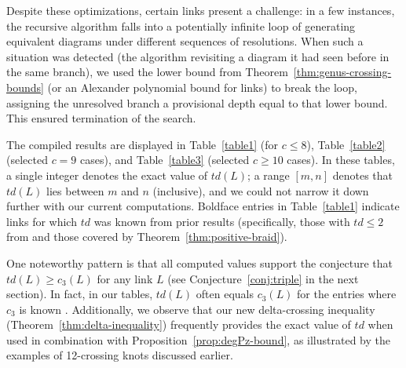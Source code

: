 \documentclass[pdftex, a4paper, 12pt, oneside]{amsart}
\numberwithin{equation}{section}
\theoremstyle{plain}
\theoremstyle{definition}
\begin{document}
	Despite these optimizations, certain links present a challenge: in a few instances, the recursive algorithm falls into a potentially infinite loop of generating equivalent diagrams under different sequences of resolutions. When such a situation was detected (the algorithm revisiting a diagram it had seen before in the same branch), we used the lower bound from Theorem~\ref{thm:genus-crossing-bounds} (or an Alexander polynomial bound for links) to break the loop, assigning the unresolved branch a provisional depth equal to that lower bound. This ensured termination of the search.
	
	The compiled results are displayed in Table~\ref{table1} (for $c\le 8$), Table~\ref{table2} (selected $c=9$ cases), and Table~\ref{table3} (selected $c\ge 10$ cases). In these tables, a single integer denotes the exact value of $td(L)$; a range $[m,n]$ denotes that $td(L)$ lies between $m$ and $n$ (inclusive), and we could not narrow it down further with our current computations. Boldface entries in Table~\ref{table1} indicate links for which $td$ was known from prior results (specifically, those with $td\le 2$ from \cite{SchTho89} and those covered by Theorem~\ref{thm:positive-braid}).
	
	One noteworthy pattern is that all computed values support the conjecture that $td(L) \ge c_3(L)$ for any link $L$ (see Conjecture~\ref{conj:triple} in the next section). In fact, in our tables, $td(L)$ often equals $c_3(L)$ for the entries where $c_3$ is known \cite{JabTro20, Jab23a}. Additionally, we observe that our new delta-crossing inequality (Theorem~\ref{thm:delta-inequality}) frequently provides the exact value of $td$ when used in combination with Proposition~\ref{prop:degPz-bound}, as illustrated by the examples of 12-crossing knots discussed earlier.
	
\end{document}
